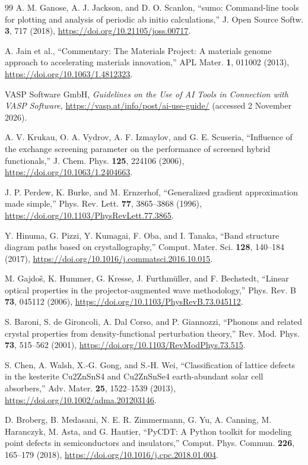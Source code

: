\documentclass[aip,jap,reprint,amsmath,amssymb]{revtex4-2}
\begin{document}
\begin{thebibliography}{99}
A. M. Ganose, A. J. Jackson, and D. O. Scanlon,
``sumo: Command-line tools for plotting and analysis of periodic ab initio calculations,''
J. Open Source Softw. \textbf{3}, 717 (2018),
\url{https://doi.org/10.21105/joss.00717}.

A. Jain et al.,
``Commentary: The Materials Project: A materials genome approach to accelerating materials innovation,''
APL Mater. \textbf{1}, 011002 (2013),
\url{https://doi.org/10.1063/1.4812323}.

VASP Software GmbH, \textit{Guidelines on the Use of AI Tools in Connection with VASP Software},
\url{https://vasp.at/info/post/ai-use-guide/} (accessed 2 November 2026).

A. V. Krukau, O. A. Vydrov, A. F. Izmaylov, and G. E. Scuseria,
``Influence of the exchange screening parameter on the performance of screened hybrid functionals,''
J. Chem. Phys. \textbf{125}, 224106 (2006),
\url{https://doi.org/10.1063/1.2404663}.

J. P. Perdew, K. Burke, and M. Ernzerhof,
``Generalized gradient approximation made simple,''
Phys. Rev. Lett. \textbf{77}, 3865--3868 (1996),
\url{https://doi.org/10.1103/PhysRevLett.77.3865}.

Y. Hinuma, G. Pizzi, Y. Kumagai, F. Oba, and I. Tanaka,
``Band structure diagram paths based on crystallography,''
Comput. Mater. Sci. \textbf{128}, 140--184 (2017),
\url{https://doi.org/10.1016/j.commatsci.2016.10.015}.

M. Gajdo\v{s}, K. Hummer, G. Kresse, J. Furthm\"uller, and F. Bechstedt,
``Linear optical properties in the projector-augmented wave methodology,''
Phys. Rev. B \textbf{73}, 045112 (2006),
\url{https://doi.org/10.1103/PhysRevB.73.045112}.

S. Baroni, S. de Gironcoli, A. Dal Corso, and P. Giannozzi,
``Phonons and related crystal properties from density-functional perturbation theory,''
Rev. Mod. Phys. \textbf{73}, 515--562 (2001),
\url{https://doi.org/10.1103/RevModPhys.73.515}.

S. Chen, A. Walsh, X.-G. Gong, and S.-H. Wei,
``Classification of lattice defects in the kesterite Cu2ZnSnS4 and Cu2ZnSnSe4 earth-abundant solar cell absorbers,''
Adv. Mater. \textbf{25}, 1522--1539 (2013),
\url{https://doi.org/10.1002/adma.201203146}.

D. Broberg, B. Medasani, N. E. R. Zimmermann, G. Yu,
A. Canning, M. Haranczyk, M. Asta, and G. Hautier,
``PyCDT: A Python toolkit for modeling point defects in
semiconductors and insulators,''
Comput. Phys. Commun. \textbf{226}, 165--179 (2018),
\url{https://doi.org/10.1016/j.cpc.2018.01.004}.


\end{thebibliography}
\end{document}
